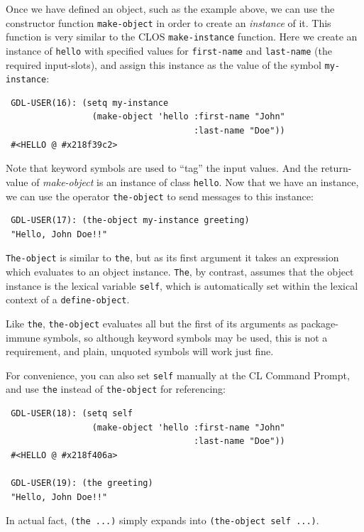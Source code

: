 \documentclass [11pt]{book}
\begin{document}
Once we have defined an object, such as the example above, we can use
the constructor function \texttt{make-object} in order to create an \emph{instance} of it. This function is very similar to the CLOS \texttt{make-instance} function. Here we create an instance of \texttt{hello} with specified values for \texttt{first-name} and \texttt{last-name} (the required input-slots), and assign this instance as the value of the symbol \texttt{my-instance}:

\begin{verbatim}
 GDL-USER(16): (setq my-instance
                 (make-object 'hello :first-name "John" 
                                     :last-name "Doe"))
 #<HELLO @ #x218f39c2>
\end{verbatim}Note that keyword symbols are used to ``tag'' the input values. And the return-value of \emph{make-object} is an instance of class \texttt{hello}. Now that we have an instance, we can use the operator \texttt{the-object} to send messages to this instance:

\begin{verbatim}
 GDL-USER(17): (the-object my-instance greeting)
 "Hello, John Doe!!"
\end{verbatim}\texttt{The-object} is similar to \texttt{the}, but as its first argument it takes an expression which evaluates to an
object instance. \texttt{The}, by contrast, assumes that the object instance is the lexical variable \texttt{self}, which is automatically set within the lexical context of a \texttt{define-object}.

Like \texttt{the}, \texttt{the-object} evaluates all but the first of its arguments as package-immune symbols,
so although keyword symbols may be used, this is not a requirement, and plain,
unquoted symbols will work just fine.

For convenience, you can also set \texttt{self} manually at the CL Command Prompt, and use \texttt{the} instead of \texttt{the-object} for referencing:

\begin{verbatim}
 GDL-USER(18): (setq self 
                 (make-object 'hello :first-name "John" 
                                     :last-name "Doe"))
 #<HELLO @ #x218f406a>

 GDL-USER(19): (the greeting)
 "Hello, John Doe!!"
\end{verbatim}In actual fact, \texttt{(the ...)} simply expands into \texttt{(the-object self ...)}.
\end{document}

